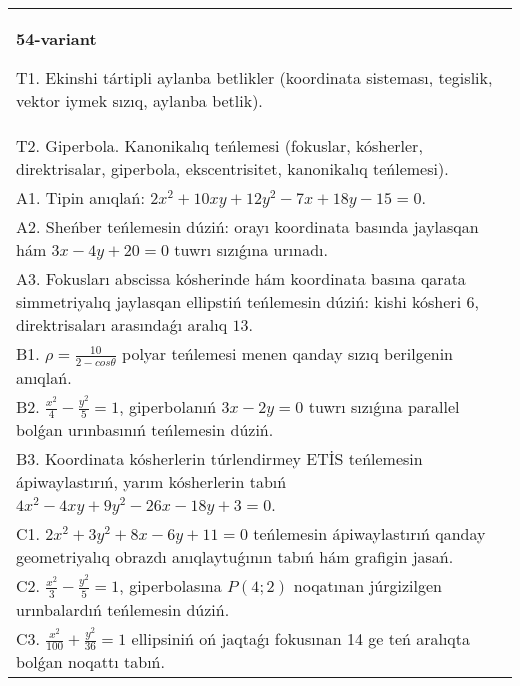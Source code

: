 \documentclass{article}
\begin{document}
\begin{tabular}{m{17cm}}
\textbf{54-variant}
\newline

T1. Ekinshi tártipli aylanba betlikler (koordinata sisteması, tegislik, vektor iymek sızıq, aylanba betlik).\\

T2. Giperbola. Kanonikalıq teńlemesi (fokuslar, kósherler, direktrisalar, giperbola, ekscentrisitet, kanonikalıq teńlemesi).\\

A1. Tipin anıqlań: $2 x^{2}+10 xy+12 y^{2}-7 x+18 y-15=0$.\\

A2. Sheńber teńlemesin dúziń: orayı koordinata basında jaylasqan hám $3 x-4 y+20=0$ tuwrı sızıǵına urınadı.\\

A3. Fokusları abscissa kósherinde hám koordinata basına qarata simmetriyalıq jaylasqan ellipstiń teńlemesin dúziń: kishi kósheri $6$, direktrisaları arasındaǵı aralıq $13$.\\

B1. $\rho = \frac{10}{2 - cos\theta}$ polyar teńlemesi menen qanday sızıq berilgenin anıqlań.  \\

B2. $\frac{x^{2}}{4} - \frac{y^{2}}{5} = 1$, giperbolanıń $3x - 2y = 0$ tuwrı sızıǵına parallel bolǵan urınbasınıń teńlemesin dúziń.  \\

B3. Koordinata kósherlerin túrlendirmey ETİS teńlemesin ápiwaylastırıń, yarım kósherlerin tabıń $4x^{2} - 4xy + 9y^{2} - 26x - 18y + 3 = 0$.\\

C1. $2x^{2} + 3y^{2} + 8x - 6y + 11 = 0$ teńlemesin ápiwaylastırıń qanday geometriyalıq obrazdı anıqlaytuǵının tabıń hám grafigin jasań.  \\

C2. $\frac{x^{2}}{3} - \frac{y^{2}}{5} = 1$, giperbolasına $P(4;2)$ noqatınan júrgizilgen urınbalardıń teńlemesin dúziń.  \\

C3. $\frac{x^{2}}{100} + \frac{y^{2}}{36} = 1$ ellipsiniń oń jaqtaǵı fokusınan 14 ge teń aralıqta bolǵan noqattı tabıń.  \\

\end{tabular}
\vspace{1cm}
\end{document}
